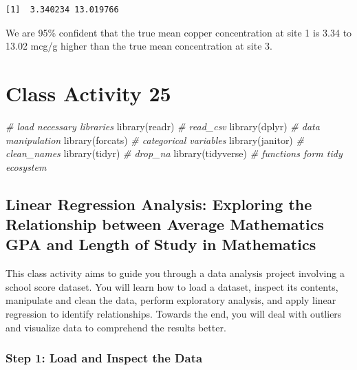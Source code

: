 \documentclass[
]{book}
\newenvironment{Shaded}{\begin{snugshade}}{\end{snugshade}}
\newcommand{\CommentTok}[1]{\textcolor[rgb]{0.56,0.35,0.01}{\textit{#1}}}
\newcommand{\FunctionTok}[1]{\textcolor[rgb]{0.00,0.00,0.00}{#1}}
\newcommand{\NormalTok}[1]{#1}
\begin{document}
\begin{verbatim}
[1]  3.340234 13.019766
\end{verbatim}

We are 95\% confident that the true mean copper concentration at site 1 is 3.34 to 13.02 mcg/g higher than the true mean concentration at site 3.

\hypertarget{class-activity-25}{%
\chapter{Class Activity 25}\label{class-activity-25}}

\begin{Shaded}
\begin{Highlighting}[]
\CommentTok{\# load necessary libraries}
\FunctionTok{library}\NormalTok{(readr) }\CommentTok{\# read\_csv}
\FunctionTok{library}\NormalTok{(dplyr) }\CommentTok{\# data manipulation}
\FunctionTok{library}\NormalTok{(forcats) }\CommentTok{\# categorical variables}
\FunctionTok{library}\NormalTok{(janitor) }\CommentTok{\# clean\_names}
\FunctionTok{library}\NormalTok{(tidyr) }\CommentTok{\# drop\_na}
\FunctionTok{library}\NormalTok{(tidyverse) }\CommentTok{\# functions form tidy ecosystem}
\end{Highlighting}
\end{Shaded}

\hypertarget{linear-regression-analysis-exploring-the-relationship-between-average-mathematics-gpa-and-length-of-study-in-mathematics}{%
\section{Linear Regression Analysis: Exploring the Relationship between Average Mathematics GPA and Length of Study in Mathematics}\label{linear-regression-analysis-exploring-the-relationship-between-average-mathematics-gpa-and-length-of-study-in-mathematics}}

This class activity aims to guide you through a data analysis project involving a school score dataset. You will learn how to load a dataset, inspect its contents, manipulate and clean the data, perform exploratory analysis, and apply linear regression to identify relationships. Towards the end, you will deal with outliers and visualize data to comprehend the results better.

\hypertarget{step-1-load-and-inspect-the-data}{%
\subsection{Step 1: Load and Inspect the Data}\label{step-1-load-and-inspect-the-data}}
\end{document}
